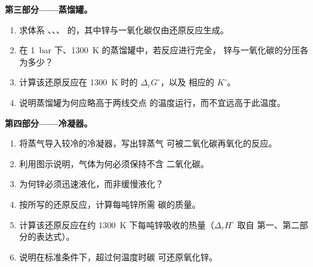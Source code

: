 \begin{problem}
\medskip
\noindent\textbf{第三部分——蒸馏罐。}
\begin{enumerate}[resume]
  \item 求体系 、、、
         的，其中锌与一氧化碳仅由还原反应生成。
  \item 在 \qty{1}{bar} 下、\qty{1300}{K} 的蒸馏罐中，若反应进行完全，
        锌与一氧化碳的分压各为多少？
  \item 计算该还原反应在 \qty{1300}{K} 时的 $\Delta_r G^\circ$，以及
        相应的 $K^\circ$。
  \item 说明蒸馏罐为何应略高于两线交点
        的温度运行，而不宜远高于此温度。
\end{enumerate}

\medskip
\noindent\textbf{第四部分——冷凝器。}
\begin{enumerate}[resume]
  \item 将蒸气导入较冷的冷凝器，写出锌蒸气
        可被二氧化碳再氧化的反应。
  \item 利用图示说明，气体为何必须保持不含
        二氧化碳。
  \item 为何锌必须迅速液化，而非缓慢液化？
  \item 按所写的还原反应，计算每吨锌所需
        碳的质量。
  \item 计算该还原反应在约
        \qty{1300}{K} 下每吨锌吸收的热量（$\Delta_r H^\circ$ 取自
        第一、第二部分的表达式）。
  \item 说明在标准条件下，超过何温度时碳
        可还原氧化锌。
\end{enumerate}
\end{problem}
